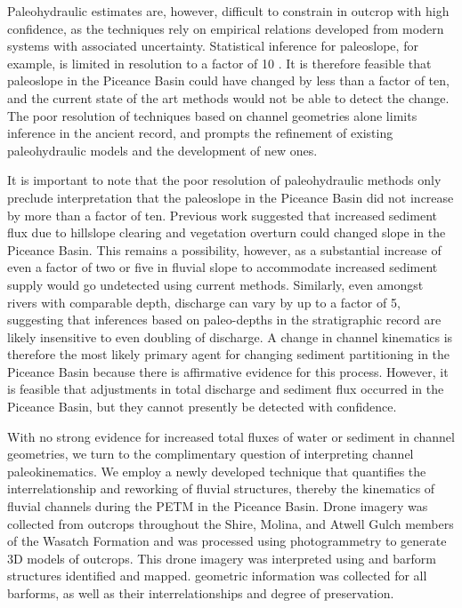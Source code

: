 \documentclass[draft]{compact_proposal}
\begin{document}
Paleohydraulic estimates are, however, difficult to constrain in outcrop with high confidence, as the techniques rely on empirical relations developed from modern systems with associated uncertainty.
Statistical inference for paleoslope, for example, is limited in resolution to a factor of 10 \cnote.
It is therefore feasible that paleoslope in the Piceance Basin could have changed by less than a factor of ten, and the current state of the art methods would not be able to detect the change.
The poor resolution of techniques based on channel geometries alone limits inference in the ancient record, and prompts the refinement of existing paleohydraulic models and the development of new ones.

It is important to note that the poor resolution of paleohydraulic methods only preclude interpretation that the paleoslope in the Piceance Basin did not increase by more than a factor of ten.
Previous work suggested that increased sediment flux due to hillslope clearing and vegetation overturn could changed slope in the Piceance Basin.
This remains a possibility, however, as a substantial increase of even a factor of two or five in fluvial slope to accommodate increased sediment supply would go undetected using current methods.
Similarly, even amongst rivers with comparable depth,  discharge can vary by up to a factor of 5, suggesting that inferences based on paleo-depths in the stratigraphic record are likely insensitive to even doubling of discharge.
A change in channel kinematics is therefore the most likely primary agent for changing sediment partitioning in the Piceance Basin because there is affirmative evidence for this process.
However, it is feasible that adjustments in total discharge and sediment flux occurred in the Piceance Basin, but they cannot presently be detected with confidence.


With no strong evidence for increased total fluxes of water or sediment in channel geometries, we turn to the complimentary question of interpreting channel paleokinematics.
We employ a newly developed technique that quantifies the interrelationship and reworking of fluvial structures, thereby  the kinematics of fluvial channels during the PETM in the Piceance Basin.
Drone imagery was collected from  outcrops throughout the Shire, Molina, and Atwell Gulch members of the Wasatch Formation and was processed using photogrammetry to generate 3D models of outcrops.
This drone imagery was interpreted using  and barform structures identified and mapped. geometric information was collected for all barforms, as well as their interrelationships and degree of preservation.
\end{document}
